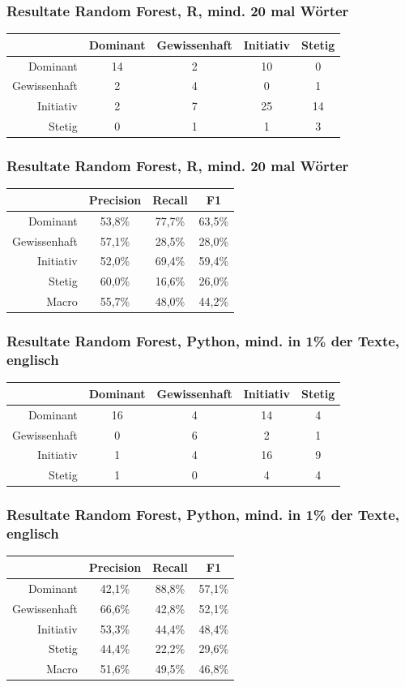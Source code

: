 \documentclass{beamer}
\begin{document}
\begin{frame}
\frametitle{Resultate Random Forest, R, mind. 20 mal Wörter}
\begin{center}
\begin{tabular}{r|c|c|c|c|}
 &  Dominant  & Gewissenhaft & Initiativ & Stetig\\
\hline
Dominant & 14 & 2 & 10& 0 \\
Gewissenhaft & 2 & 4 & 0 & 1\\
Initiativ & 2 & 7  & 25 & 14\\
Stetig & 0 & 1 & 1 &  3
\end{tabular}
\end{center}
\end{frame}
\begin{frame}
\frametitle{Resultate Random Forest, R, mind. 20 mal Wörter}
\begin{center}
\begin{tabular}{r|c|c|c|}
 &  Precision  & Recall & F1 \\
\hline
Dominant     & 53,8\% & 77,7\% & 63,5\% \\
Gewissenhaft & 57,1\% & 28,5\% & 28,0\% \\
Initiativ    & 52,0\% & 69,4\% & 59,4\% \\
Stetig       & 60,0\% & 16,6\% & 26,0\% \\
\hline
Macro        & 55,7\% & 48,0\% & 44,2\%
\end{tabular}
\end{center}
\end{frame}
\begin{frame}
\frametitle{Resultate Random Forest, Python, mind. in 1\% der Texte, englisch}
\begin{center}
\begin{tabular}{r|c|c|c|c|}
 &  Dominant  & Gewissenhaft & Initiativ & Stetig\\
\hline
Dominant & 16 & 4 & 14 & 4 \\
Gewissenhaft & 0 & 6 & 2 & 1\\
Initiativ & 1 & 4 & 16 & 9\\
Stetig & 1 & 0 & 4 & 4
\end{tabular}
\end{center}
\end{frame}
\begin{frame}
\frametitle{Resultate Random Forest, Python, mind. in 1\% der Texte, englisch}
\begin{center}
\begin{tabular}{r|c|c|c|}
 &  Precision  & Recall & F1 \\
\hline
Dominant     & 42,1\% & 88,8\% & 57,1\% \\
Gewissenhaft & 66,6\% & 42,8\% & 52,1\% \\
Initiativ    & 53,3\% & 44,4\% & 48,4\% \\
Stetig       & 44,4\% & 22,2\% & 29,6\% \\
\hline
Macro        & 51,6\% & 49,5\% & 46,8\%
\end{tabular}
\end{center}
\end{frame}
\end{document}
